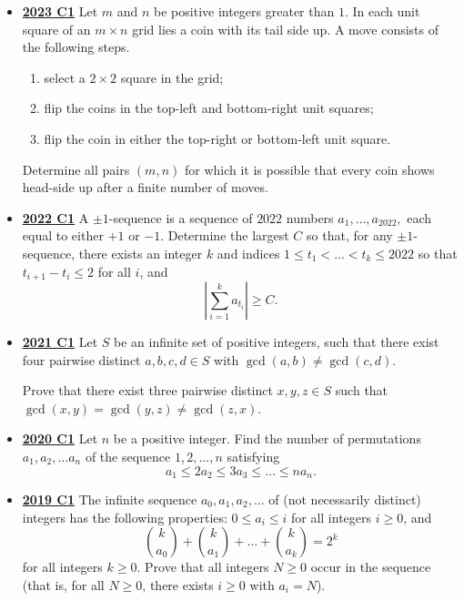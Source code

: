 \documentclass[11pt]{scrartcl}
\begin{document}
\begin{itemize}[leftmargin=*]
Find the maximum possible sum of all the scores of the $n$ students.
\item \href{https://artofproblemsolving.com/community/c6h3359749p31218491}{\textbf{2023 C1}} Let $m$ and $n$ be positive integers greater than $1$. In each unit square of an $m\times n$ grid lies a coin with its tail side up. A move consists of the following steps.
\begin{enumerate}[1.]
\item select a $2\times 2$ square in the grid;
\item flip the coins in the top-left and bottom-right unit squares;
\item flip the coin in either the top-right or bottom-left unit square.
 
\end{enumerate}
Determine all pairs $(m,n)$ for which it is possible that every coin shows head-side up after a finite number of moves.

    \item \href{https://artofproblemsolving.com/community/c6h3107334p28104276}{\textbf{2022 C1}} 	A $\pm 1$-sequence is a sequence of $2022$ numbers $a_1, \dots, a_{2022},$ each equal to either $+1$ or $-1$. Determine the largest $C$ so that, for any $\pm 1$-sequence, there exists an integer $k$ and indices $1 \leqslant t_1 < \dots < t_k \leqslant 2022$ so that $t_{i+1} - t_i \leqslant 2$ for all $i$, and$$\left| \sum_{i = 1}^{k} a_{t_i} \right| \geqslant C.$$
    
    \item \href{https://artofproblemsolving.com/community/c6h2882547p25627520}{\textbf{2021 C1}} Let $S$ be an infinite set of positive integers, such that there exist four pairwise distinct $a,b,c,d \in S$ with $\gcd(a,b) \neq \gcd(c,d)$. 
    
    Prove that there exist three pairwise distinct $x,y,z \in S$ such that $\gcd(x,y)=\gcd(y,z) \neq \gcd(z,x)$.
    
    \item \href{https://artofproblemsolving.com/community/c6h2625893p22698309}{\textbf{2020 C1}} Let $n$ be a positive integer. Find the number of permutations $a_1, a_2,\dots a_n$ of the
sequence $1, 2, \dots , n$ satisfying
$$a_1 \leqslant 2a_2\leqslant 3a_3 \leqslant \dots \leqslant na_n.$$

    \item \href{https://artofproblemsolving.com/community/c6h2279044p17829263}{\textbf{2019 C1}} The infinite sequence $a_0,a _1, a_2, \dots$ of (not necessarily distinct) integers has the following properties: $0\leqslant a_i \leqslant i$ for all integers $i\geqslant 0$, and\[\binom{k}{a_0} + \binom{k}{a_1} + \dots + \binom{k}{a_k} = 2^k\]for all integers $k\geqslant 0$. Prove that all integers $N\geqslant 0$ occur in the sequence (that is, for all $N\geqslant 0$, there exists $i\geqslant 0$ with $a_i=N$).


\end{itemize}
\end{document}
